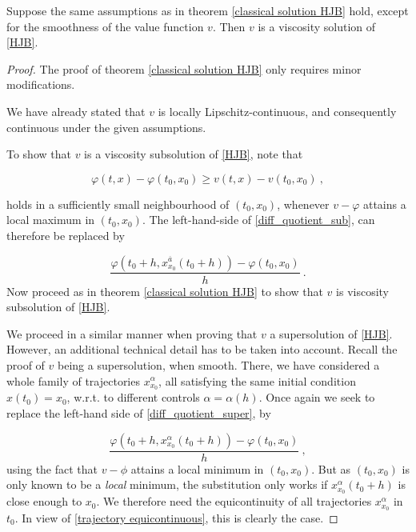 	\begin{theorem}
		\label{viscosity solution HJB}
		Suppose the same assumptions as in theorem \ref{classical solution HJB} hold, except for the smoothness of the value function $ v $. Then $ v $ is a viscosity solution of \eqref{HJB}.
		
		\begin{proof}
			The proof of theorem \ref{classical solution HJB} only requires minor modifications.
			
			We have already stated that $ v $ is locally Lipschitz-continuous, and consequently continuous under the given assumptions.
			
			To show that $ v $ is a viscosity subsolution of \eqref{HJB}, note that
			
			\begin{equation*}
				\varphi(t, x) - \varphi(t_0, x_0) \geq v(t, x) - v(t_0, x_0) \ ,
			\end{equation*}
			
			holds in a sufficiently small neighbourhood of $ (t_0, x_0) $, whenever $ v - \varphi $ attains a local maximum in $ (t_0, x_0) $.
			The left-hand-side of \eqref{diff_quotient_sub}, can therefore be replaced by
			
			\begin{equation*}
				\frac{\varphi(t_0 + h, x^{\overline{a}}_{x_0}(t_0 + h)) - \varphi(t_0, x_0)}{h} \ .
			\end{equation*}
			Now proceed as in theorem \ref{classical solution HJB} to show that $ v $ is viscosity subsolution of \eqref{HJB}.
			
			We proceed in a similar manner when proving that $ v $ a supersolution of \eqref{HJB}. However, an additional technical detail has to be taken into account. Recall the proof of $ v $ being a supersolution, when smooth. There, we have considered a whole family of trajectories $ x_{x_0}^{\alpha} $, all satisfying the same initial condition $ x(t_0) = x_0 $, w.r.t. to different controls $ \alpha = \alpha(h) $. Once again we seek to replace the left-hand side of \eqref{diff_quotient_super}, by

			\begin{equation*}
				\frac{\varphi(t_0 + h, x^{\alpha}_{x_0}(t_0 + h)) - \varphi(t_0, x_0)}{h} \ ,
			\end{equation*}
			using the fact that $ v - \phi $ attains a local minimum in $ (t_0, x_0) $.
			But as $ (t_0, x_0) $ is only known to be a \emph{local} minimum, the substitution only works if $ x^{\alpha}_{x_0}(t_0 + h) $ is close enough to $ x_0 $. We therefore need the equicontinuity of all trajectories $ x^{\alpha}_{x_0} $ in $ t_0 $. In view of \eqref{trajectory equicontinuous}, this is clearly the case.
		\end{proof}
	\end{theorem}

